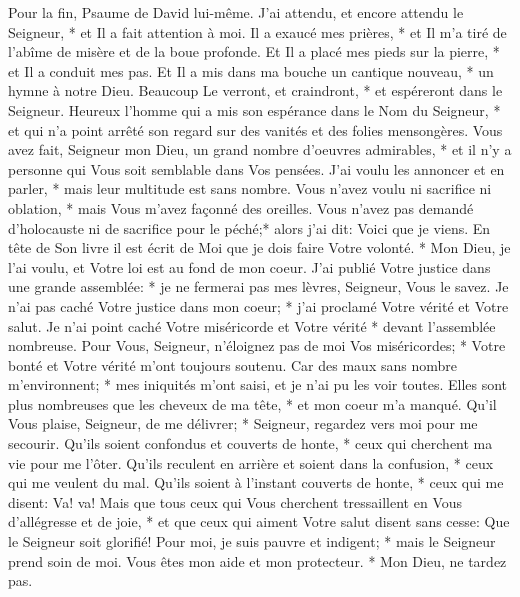 Pour la fin, Psaume de David lui-même.
J'ai attendu, et encore attendu le Seigneur, * et Il a fait attention à moi.
Il a exaucé mes prières, * et Il m'a tiré de l'abîme de misère et de la boue profonde. Et Il a placé mes pieds sur la pierre, * et Il a conduit mes pas.
Et Il a mis dans ma bouche un cantique nouveau, * un hymne à notre Dieu. Beaucoup Le verront, et craindront, * et espéreront dans le Seigneur.
Heureux l'homme qui a mis son espérance dans le Nom du Seigneur, * et qui n'a point arrêté son regard sur des vanités et des folies mensongères.
Vous avez fait, Seigneur mon Dieu, un grand nombre d'oeuvres admirables, * et il n'y a personne qui Vous soit semblable dans Vos pensées. J'ai voulu les annoncer et en parler, * mais leur multitude est sans nombre.
Vous n'avez voulu ni sacrifice ni oblation, * mais Vous m'avez façonné des oreilles. Vous n'avez pas demandé d'holocauste ni de sacrifice pour le péché;*
alors j'ai dit: Voici que je viens. En tête de Son livre il est écrit de Moi
que je dois faire Votre volonté. * Mon Dieu, je l'ai voulu, et Votre loi est au fond de mon coeur.
J'ai publié Votre justice dans une grande assemblée: * je ne fermerai pas mes lèvres, Seigneur, Vous le savez.
Je n'ai pas caché Votre justice dans mon coeur; * j'ai proclamé Votre vérité et Votre salut. Je n'ai point caché Votre miséricorde et Votre vérité * devant l'assemblée nombreuse.
Pour Vous, Seigneur, n'éloignez pas de moi Vos miséricordes; * Votre bonté et Votre vérité m'ont toujours soutenu.
Car des maux sans nombre m'environnent; * mes iniquités m'ont saisi, et je n'ai pu les voir toutes. Elles sont plus nombreuses que les cheveux de ma tête, * et mon coeur m'a manqué.
Qu'il Vous plaise, Seigneur, de me délivrer; * Seigneur, regardez vers moi pour me secourir.
Qu'ils soient confondus et couverts de honte, * ceux qui cherchent ma vie pour me l'ôter. Qu'ils reculent en arrière et soient dans la confusion, * ceux qui me veulent du mal.
Qu'ils soient à l'instant couverts de honte, * ceux qui me disent: Va! va!
Mais que tous ceux qui Vous cherchent tressaillent en Vous d'allégresse et de joie, * et que ceux qui aiment Votre salut disent sans cesse: Que le Seigneur soit glorifié!
Pour moi, je suis pauvre et indigent; * mais le Seigneur prend soin de moi. Vous êtes mon aide et mon protecteur. * Mon Dieu, ne tardez pas.

